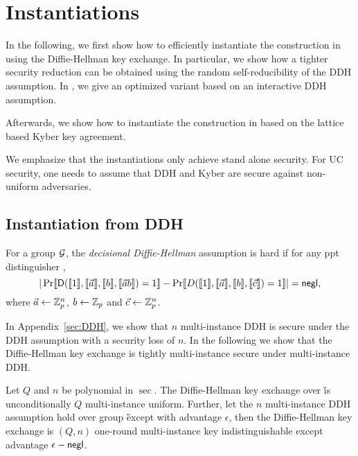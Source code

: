 \section{Instantiations}\label{sec:inst}
In the following, we first show how to efficiently instantiate the construction in  using the Diffie-Hellman key exchange. In particular, we show how a tighter security reduction can be obtained using the random self-reducibility of the DDH assumption. In , we give an optimized variant based on an interactive DDH assumption.

Afterwards, we show how to instantiate the construction in  based on the lattice based Kyber key agreement. 

We emphasize that the instantiations only achieve stand alone security. For UC security, one needs to assume that DDH and Kyber are secure against non-uniform adversaries. 


\subsection{Instantiation from DDH}



\begin{definition}
For a group $\mathcal{G}$, the \emph{decisional Diffie-Hellman} assumption is hard if for any ppt distinguisher \D,
$$
|\Pr\llbracket \mathsf D(\llbracket 1\rrbracket,\llbracket \vec{a}\rrbracket,\llbracket b\rrbracket,\llbracket \vec{a}b\rrbracket)=1\rrbracket-\Pr\llbracket D(\llbracket 1\rrbracket,\llbracket \vec{a}\rrbracket,\llbracket b\rrbracket,\llbracket \vec{c}\rrbracket)=1\rrbracket|=\mathsf{negl},
$$
where $\vec{a}\leftarrow\mathbb Z_p^n$, $b\leftarrow\mathbb Z_p$ and $\vec{c}\leftarrow\mathbb Z_p^n$.
\end{definition}

In Appendix~\ref{sec:DDH}, we show that $n$ multi-instance DDH is secure under the DDH assumption with a security loss of $n$. In the following we show that the Diffie-Hellman key exchange is tightly multi-instance secure under multi-instance DDH. 

\begin{lemma}\label{lem:DDH}
Let $Q$ and $n$ be polynomial in $\sec$.
The Diffie-Hellman key exchange over \G is unconditionally $Q$ multi-instance uniform. Further, let the $n$ multi-instance DDH assumption hold over group \G except with advantage $\epsilon$, then the Diffie-Hellman key exchange is $(Q,n)$ one-round multi-instance key indistinguishable except advantage $\epsilon-\mathsf{negl}$. 
\end{lemma}

